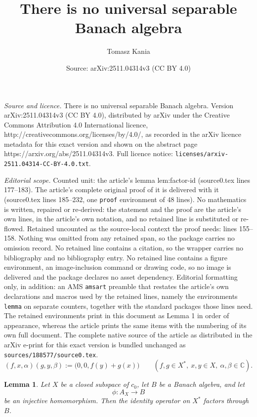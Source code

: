 \documentclass[10pt,a4paper]{amsart}
\title{There is no universal separable Banach algebra}
\author{Tomasz Kania}
\date{Source: arXiv:2511.04314v3 (CC BY 4.0)}
\newtheorem{lemma}{Lemma}
\newcommand{\C}{\mathbb{C}}
\begin{document}
\maketitle

\noindent\emph{Source and licence.} There is no universal separable Banach algebra. Version arXiv:2511.04314v3 (CC BY 4.0), distributed by arXiv under the Creative Commons Attribution 4.0 International licence, http://creativecommons.org/licenses/by/4.0/, as recorded in the arXiv licence metadata for this exact version and shown on the abstract page https://arxiv.org/abs/2511.04314v3. Full licence notice: \texttt{licenses/arxiv-2511.04314-CC-BY-4.0.txt}.\par\smallskip

\noindent\textit{Editorial scope.} Counted unit: the article's lemma lem:factor-id (source0.tex lines 177--183). The article's complete original proof of it is delivered with it (source0.tex lines 185--232, one \texttt{proof} environment of 48 lines). No mathematics is written, repaired or re-derived: the statement and the proof are the article's own lines, in the article's own notation, and no retained line is substituted or re-flowed.  Retained uncounted as the source-local context the proof needs: lines 155--158.  Nothing was omitted from any retained span, so the package carries no omission record.  No retained line contains a citation, so the wrapper carries no bibliography and no bibliography entry.  No retained line contains a figure environment, an image-inclusion command or drawing code, so no image is delivered and the package declares no asset dependency.  Editorial formatting only, in addition: an AMS \texttt{amsart} preamble that restates the article's own declarations and macros used by the retained lines, namely the environments \texttt{lemma} on separate counters, together with the standard packages those lines need.  The retained environments print in this document as Lemma 1 in order of appearance, whereas the article prints the same items with the numbering of its own full document.  The complete native source of the article as distributed in the arXiv e-print for this exact version is bundled unchanged as \texttt{sources/188577/source0.tex}.
\begin{equation}\label{eq:product}
(f,x,\alpha)(g,y,\beta) := \bigl(0,0,f(y)+g(x)\bigr)
\qquad (f,g\in X^*,\ x,y\in X,\ \alpha,\beta\in \C).
\end{equation}

\begin{lemma}\label{lem:factor-id}
Let $X$ be a closed subspace of $c_0$, let $B$ be a Banach algebra, and let
\[
\phi:A_X\longrightarrow B
\]
be an injective homomorphism. Then the identity operator on $X^*$ factors through $B$.
\end{lemma}
\end{document}
